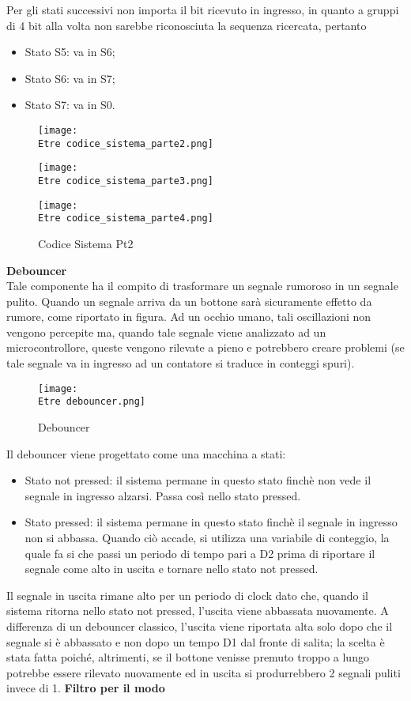 \documentclass[12pt]{article}
\def \Etre {Allegati/Esercizio3/}
\begin{document}
Per gli stati successivi non importa il bit ricevuto in ingresso, in quanto a gruppi di 4 bit alla volta non sarebbe riconosciuta la sequenza ricercata, pertanto
\begin{itemize}
    \item Stato S5: va in S6;
    \item Stato S6: va in S7;
    \item Stato S7: va in S0.
\end{itemize}
\begin{figure}[ht!]
    \centering
    \texttt{[image: \\Etre codice\_sistema\_parte2.png]}
\end{figure}
\begin{figure}[ht!]
    \centering
    \texttt{[image: \\Etre codice\_sistema\_parte3.png]}
\end{figure}
\begin{figure}[ht!]
    \centering
    \texttt{[image: \\Etre codice\_sistema\_parte4.png]}
    \caption{Codice Sistema Pt2}
\end{figure}
\clearpage
{\large \textbf{Debouncer}}
\\Tale componente ha il compito di trasformare un segnale rumoroso in un segnale pulito. Quando un segnale arriva da un bottone sarà sicuramente effetto da rumore, come riportato in figura. Ad un occhio umano, tali oscillazioni non vengono percepite ma, quando tale segnale viene analizzato ad un microcontrollore, queste vengono rilevate a pieno e potrebbero creare problemi (se tale segnale va in ingresso ad un contatore si traduce in conteggi spuri).
\begin{figure}[ht!]
    \centering
    \texttt{[image: \\Etre debouncer.png]}
    \caption{Debouncer}
\end{figure}
Il debouncer viene progettato come una macchina a stati:
\begin{itemize}
    \item Stato not pressed: il sistema permane in questo stato finchè non vede il segnale in ingresso alzarsi. Passa così nello stato pressed.
    \item Stato pressed: il sistema permane in questo stato finchè il segnale in ingresso non si abbassa. Quando ciò accade, si utilizza una variabile di conteggio, la quale fa si che passi un periodo di tempo pari a D2 prima di riportare il segnale come alto in uscita e tornare nello stato not pressed.
\end{itemize}
Il segnale in uscita rimane alto per un periodo di clock dato che, quando il sistema ritorna nello stato not pressed, l’uscita viene abbassata nuovamente. A differenza di un debouncer classico, l’uscita viene riportata alta solo dopo che il segnale si è abbassato e non dopo un tempo D1 dal fronte di salita; la scelta è stata fatta poiché, altrimenti, se il bottone venisse premuto troppo a lungo potrebbe essere rilevato nuovamente ed in uscita si produrrebbero 2 segnali puliti invece di 1.
\newpage
{\large \textbf{Filtro per il modo}}
\end{document}
